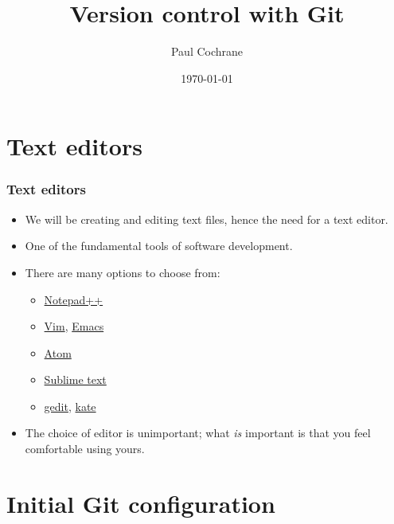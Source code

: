 \documentclass{git_course}
\title{Version control with Git}
\author{Paul Cochrane}
\date{\today}
\begin{document}
\maketitle

\begin{frame}
\begin{multicols}{2}
\begin{spacing}{0.8}
\tableofcontents
\end{spacing}
\end{multicols}
\end{frame}






\section{Text editors}

\begin{frame}
\frametitle{Text editors}
\begin{itemize}
    \item We will be creating and editing text files, hence the need for a
        text editor.
    \item One of the fundamental tools of software development.
    \item There are many options to choose from:
    \begin{itemize}
        \item \href{https://notepad-plus-plus.org/}{Notepad++}
        \item \href{https://www.vim.org/}{Vim}, \href{https://www.gnu.org/software/emacs/}{Emacs}
        \item \href{https://atom.io/}{Atom}
        \item \href{https://www.sublimetext.com/}{Sublime text}
        \item \href{https://wiki.gnome.org/Apps/Gedit}{gedit},
            \href{https://kate-editor.org/}{kate}
    \end{itemize}
    \item The choice of editor is unimportant; what \emph{is} important is
        that you feel comfortable using yours.
\end{itemize}
\end{frame}

\section{Initial Git configuration}
\end{document}

